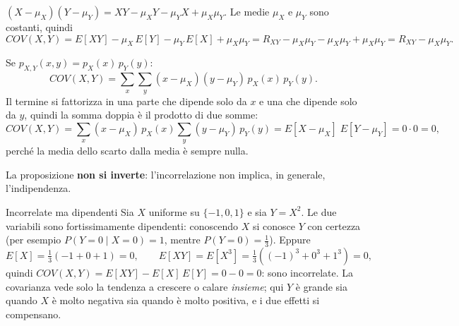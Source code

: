 
\begin{dimostrazione}
 $(X - \mu_X)(Y - \mu_Y) = XY - \mu_X Y - \mu_Y X + \mu_X \mu_Y$.
 Le medie $\mu_X$ e $\mu_Y$ sono costanti, quindi
\[ COV(X, Y) = E[XY] - \mu_X\, E[Y] - \mu_Y\, E[X] + \mu_X \mu_Y = R_{XY} - \mu_X \mu_Y - \mu_X \mu_Y + \mu_X \mu_Y
   = R_{XY} - \mu_X \mu_Y . \]
\end{dimostrazione}



\begin{dimostrazione}
 Se $p_{X,Y}(x, y) = p_X(x)\, p_Y(y)$:
\[ COV(X, Y) = \sum_{x} \sum_{y} (x - \mu_X)(y - \mu_Y)\, p_X(x)\, p_Y(y) . \]
 Il termine si fattorizza in una parte che dipende solo da $x$ e una che dipende solo
da $y$, quindi la somma doppia è il prodotto di due somme:
\[ COV(X, Y) = \sum_{x} (x - \mu_X)\, p_X(x) \sum_{y} (y - \mu_Y)\, p_Y(y) = E[X - \mu_X]\; E[Y - \mu_Y] = 0 \cdot 0 = 0 , \]
perché la media dello scarto dalla media è sempre nulla.
\end{dimostrazione}

La proposizione \textbf{non si inverte}: l'incorrelazione non implica, in generale, l'indipendenza.

\begin{esempio}{Incorrelate ma dipendenti}
Sia $X$ uniforme su $\{-1, 0, 1\}$ e sia $Y = X^2$. Le due variabili sono fortissimamente dipendenti: conoscendo $X$ si
conosce $Y$ con certezza (per esempio $P(Y = 0 \mid X = 0) = 1$, mentre $P(Y = 0) = \frac13$). Eppure
\[ E[X] = \tfrac13(-1 + 0 + 1) = 0 , \qquad E[XY] = E[X^3] = \tfrac13\left((-1)^3 + 0^3 + 1^3\right) = 0 , \]
quindi $COV(X, Y) = E[XY] - E[X]\,E[Y] = 0 - 0 = 0$: sono incorrelate. La covarianza vede solo la tendenza a crescere
o calare \emph{insieme}; qui $Y$ è grande sia quando $X$ è molto negativa sia quando è molto positiva, e i due effetti
si compensano.
\end{esempio}

